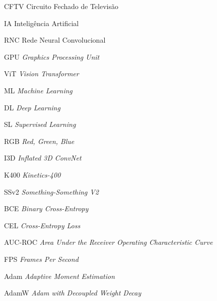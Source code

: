 \documentclass[12pt, %
openright, 
oneside, %
a4paper,    %
brazil]{facom-ufu-abntex2}
\begin{document}
\begin{siglas} %
\item[CFTV] Circuito Fechado de Televisão
\item[IA] Inteligência Artificial
\item[RNC] Rede Neural Convolucional
\item[GPU] \textit{Graphics Processing Unit}
\item[ViT] \textit{Vision Transformer}
\item[ML] \textit{Machine Learning}
\item[DL] \textit{Deep Learning}
\item[SL] \textit{Supervised Learning}
\item[RGB] \textit{Red, Green, Blue}
\item[I3D] \textit{Inflated 3D ConvNet}
\item[K400] \textit{Kinetics-400}
\item[SSv2] \textit{Something-Something V2}
\item[BCE] \textit{Binary Cross-Entropy}
\item[CEL] \textit{Cross-Entropy Loss}
\item[AUC-ROC] \textit{Area Under the Receiver Operating Characteristic Curve}
\item [FPS] \textit{Frames Per Second}
\item [Adam] \textit{Adaptive Moment Estimation}
\item [AdamW] \textit{Adam with Decoupled Weight Decay}
\end{siglas}


\tableofcontents*
\cleardoublepage





\textual
\end{document}
